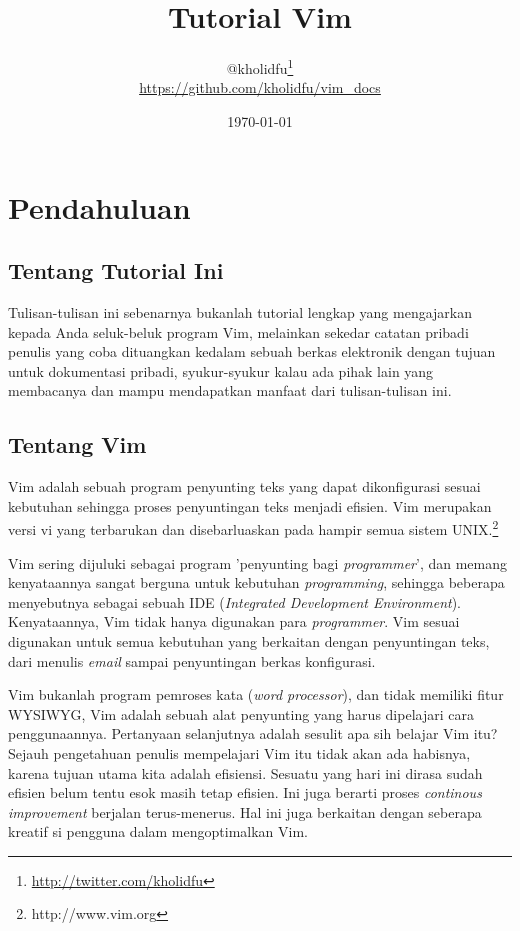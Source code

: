 \documentclass{article}
\author{
  @kholidfu\footnote{\url{http://twitter.com/kholidfu}}\\
  \footnotesize{\url{https://github.com/kholidfu/vim\_docs}}
}
\title{Tutorial Vim}
\date{\today}
\begin{document}
\maketitle
\tableofcontents
\pagebreak

\section{Pendahuluan}
\subsection{Tentang Tutorial Ini}
Tulisan-tulisan ini sebenarnya bukanlah tutorial lengkap
yang mengajarkan kepada Anda seluk-beluk program Vim,
melainkan sekedar catatan pribadi penulis yang coba
dituangkan kedalam sebuah berkas elektronik dengan tujuan
untuk dokumentasi pribadi, syukur-syukur kalau ada pihak
lain yang membacanya dan mampu mendapatkan manfaat dari
tulisan-tulisan ini.

\subsection{Tentang Vim}
Vim adalah sebuah program penyunting teks yang dapat
dikonfigurasi sesuai kebutuhan sehingga proses penyuntingan
teks menjadi efisien. Vim merupakan versi vi yang
terbarukan dan disebarluaskan pada hampir semua sistem
UNIX.\footnote{http://www.vim.org}

Vim sering dijuluki sebagai program 'penyunting bagi
\emph{programmer}', dan memang kenyataannya sangat berguna
untuk kebutuhan \emph{programming}, sehingga beberapa
menyebutnya sebagai sebuah IDE (\emph{Integrated Development
Environment}). Kenyataannya, Vim tidak hanya digunakan para
\emph{programmer}. Vim sesuai digunakan untuk semua
kebutuhan yang berkaitan dengan penyuntingan teks, dari
menulis \emph{email} sampai penyuntingan berkas konfigurasi.

Vim bukanlah program pemroses kata (\emph{word processor}),
dan tidak memiliki fitur WYSIWYG, Vim adalah sebuah alat
penyunting yang harus dipelajari cara penggunaannya.
Pertanyaan selanjutnya adalah sesulit apa sih belajar Vim
itu? Sejauh pengetahuan penulis mempelajari Vim itu tidak
akan ada habisnya, karena tujuan utama kita adalah efisiensi.
Sesuatu yang hari ini dirasa sudah efisien belum tentu esok
masih tetap efisien. Ini juga berarti proses \emph{continous
improvement} berjalan terus-menerus. Hal ini juga berkaitan
dengan seberapa kreatif si pengguna dalam mengoptimalkan
Vim.
\end{document}
